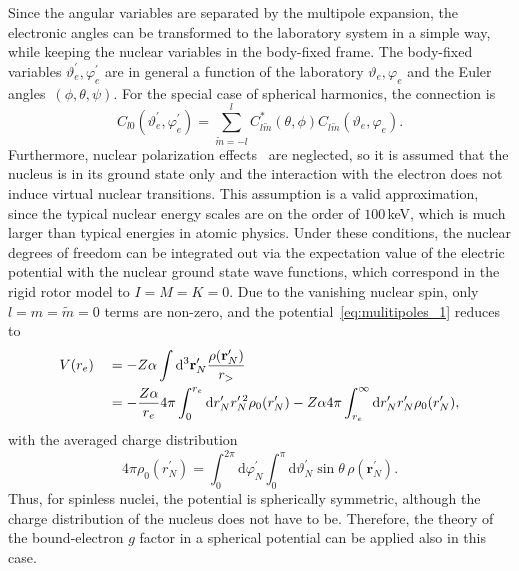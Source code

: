 Since the angular variables are separated by the multipole expansion, the electronic angles can be transformed to the laboratory system in a simple way, while keeping the nuclear variables in the body-fixed frame. The body-fixed variables $\vartheta^{\prime}_e,\varphi^\prime_e$ are in general a function of the laboratory $\vartheta_e,\varphi_e$ and the Euler angles~$(\phi,\theta,\psi)$. For the special case of spherical harmonics, the connection is
\begin{equation}
C_{l0}(\vartheta_e^\prime,\varphi_e^\prime) = \sum_{\tilde{m}=-l}^l C^{*}_{l\tilde{m}}(\theta,\phi)C_{l\tilde{m}}(\vartheta_e,\varphi_e).
\end{equation}
Furthermore, nuclear polarization effects~\cite{Nefiodov} are neglected, so it is assumed that the nucleus is in its ground state only and the interaction with the electron does not induce virtual nuclear transitions. This assumption is a valid approximation, since the typical nuclear energy scales are on the order of $100\,$keV, which is much larger than typical energies in atomic physics. Under these conditions, the nuclear degrees of freedom can be integrated out via the expectation value of the electric potential with the nuclear ground state wave functions, which correspond in the rigid rotor model to $I=M=K=0$. Due to the vanishing nuclear spin, only $l=m=\tilde{m}=0$ terms are non-zero, and the potential~\eqref{eq:mulitipoles_1} reduces to
\begin{alignat}{2}
\label{eq:gfac_monopole}
&V(r_e)&&=-Z\alpha \int\mathrm{d}^3\mathbf{r}^\prime_N\frac{\rho(\mathbf{r}_N^\prime)}{r_>}\\
& &&= -\frac{Z\alpha}{r_e} 4\pi\int_0^{r_e}\mathrm{d}r_N^\prime r_N^{\prime\,2}\rho_0(r_N^\prime) 
-Z\alpha 4\pi\int_{r_e}^\infty\mathrm{d}r_N^\prime r_N^{\prime}\rho_0(r_N^\prime), \notag
\end{alignat}
with the averaged charge distribution
\begin{equation}
\label{eq:rho_averaged}
4\pi\rho_0(r^\prime_N)=\int_0^{2\pi}\mathrm{d}\varphi_N^\prime \int_0^\pi \mathrm{d}\vartheta_N^\prime \sin\theta\,\rho(\mathbf{r}_N^\prime).
\end{equation}
Thus, for spinless nuclei, the potential is spherically symmetric, although the charge distribution of the nucleus does not have to be. Therefore, the theory of the bound-electron $g$ factor in a spherical potential can be applied also in this case.

